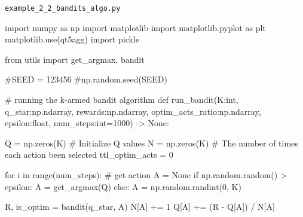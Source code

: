 \documentclass[
  letterpaper,
]{krantz}
\makeatletter
\newenvironment{Shaded}{\begin{snugshade}}{\end{snugshade}}
\newcommand{\BuiltInTok}[1]{\textcolor[rgb]{0.00,0.23,0.31}{#1}}
\newcommand{\CommentTok}[1]{\textcolor[rgb]{0.37,0.37,0.37}{#1}}
\newcommand{\ControlFlowTok}[1]{\textcolor[rgb]{0.00,0.23,0.31}{#1}}
\newcommand{\DecValTok}[1]{\textcolor[rgb]{0.68,0.00,0.00}{#1}}
\newcommand{\ImportTok}[1]{\textcolor[rgb]{0.00,0.46,0.62}{#1}}
\newcommand{\KeywordTok}[1]{\textcolor[rgb]{0.00,0.23,0.31}{#1}}
\newcommand{\NormalTok}[1]{\textcolor[rgb]{0.00,0.23,0.31}{#1}}
\newcommand{\OperatorTok}[1]{\textcolor[rgb]{0.37,0.37,0.37}{#1}}
\newcommand{\StringTok}[1]{\textcolor[rgb]{0.13,0.47,0.30}{#1}}
\newcommand{\VariableTok}[1]{\textcolor[rgb]{0.07,0.07,0.07}{#1}}
\newenvironment{kframe}{%
\medskip{}
\setlength{\fboxsep}{.8em}
 \def\at@end@of@kframe{}%
 \ifinner\ifhmode%
  \def\at@end@of@kframe{\end{minipage}}%
  \begin{minipage}{\columnwidth}%
 \fi\fi%
 \def\FrameCommand##1{\hskip\@totalleftmargin \hskip-\fboxsep
 \colorbox{shadecolor}{##1}\hskip-\fboxsep
     \hskip-\linewidth \hskip-\@totalleftmargin \hskip\columnwidth}%
 \MakeFramed {\advance\hsize-\width
   \@totalleftmargin\z@ \linewidth\hsize
   \@setminipage}}%
 {\par\unskip\endMakeFramed%
 \at@end@of@kframe}
\renewenvironment{Shaded}{\begin{kframe}}{\end{kframe}}
\theoremstyle{plain}
\theoremstyle{definition}
\theoremstyle{definition}
\theoremstyle{remark}
\makeatother
\begin{document}
\begin{codelisting}

\caption{\texttt{example\_2\_2\_bandits\_algo.py}}

\begin{Shaded}
\begin{Highlighting}[]
\ImportTok{import}\NormalTok{ numpy }\ImportTok{as}\NormalTok{ np}
\ImportTok{import}\NormalTok{ matplotlib}
\ImportTok{import}\NormalTok{ matplotlib.pyplot }\ImportTok{as}\NormalTok{ plt}
\NormalTok{matplotlib.use(}\StringTok{\textquotesingle{}qt5agg\textquotesingle{}}\NormalTok{)}
\ImportTok{import}\NormalTok{ pickle}

\ImportTok{from}\NormalTok{ utils }\ImportTok{import}\NormalTok{ get\_argmax, bandit}

\CommentTok{\#SEED = 123456}
\CommentTok{\#np.random.seed(SEED)}

\CommentTok{\# running the k{-}armed bandit algorithm}
\KeywordTok{def}\NormalTok{ run\_bandit(K:}\BuiltInTok{int}\NormalTok{, }
\NormalTok{            q\_star:np.ndarray,}
\NormalTok{            rewards:np.ndarray,}
\NormalTok{            optim\_acts\_ratio:np.ndarray,}
\NormalTok{            epsilon:}\BuiltInTok{float}\NormalTok{, }
\NormalTok{            num\_steps:}\BuiltInTok{int}\OperatorTok{=}\DecValTok{1000}\NormalTok{) }\OperatorTok{{-}\textgreater{}} \VariableTok{None}\NormalTok{:}
    
\NormalTok{    Q }\OperatorTok{=}\NormalTok{ np.zeros(K)     }\CommentTok{\# Initialize Q values}
\NormalTok{    N }\OperatorTok{=}\NormalTok{ np.zeros(K)     }\CommentTok{\# The number of times each action been selected}
\NormalTok{    ttl\_optim\_acts }\OperatorTok{=} \DecValTok{0}

    \ControlFlowTok{for}\NormalTok{ i }\KeywordTok{in} \BuiltInTok{range}\NormalTok{(num\_steps):}
        \CommentTok{\# get action}
\NormalTok{        A }\OperatorTok{=} \VariableTok{None}
        \ControlFlowTok{if}\NormalTok{ np.random.random() }\OperatorTok{\textgreater{}}\NormalTok{ epsilon:}
\NormalTok{            A }\OperatorTok{=}\NormalTok{ get\_argmax(Q)}
        \ControlFlowTok{else}\NormalTok{:}
\NormalTok{            A }\OperatorTok{=}\NormalTok{ np.random.randint(}\DecValTok{0}\NormalTok{, K)}
        
\NormalTok{        R, is\_optim }\OperatorTok{=}\NormalTok{ bandit(q\_star, A)}
\NormalTok{        N[A] }\OperatorTok{+=} \DecValTok{1}
\NormalTok{        Q[A] }\OperatorTok{+=}\NormalTok{ (R }\OperatorTok{{-}}\NormalTok{ Q[A]) }\OperatorTok{/}\NormalTok{ N[A]}


\end{Highlighting}
\end{Shaded}
\end{codelisting}
\end{document}
